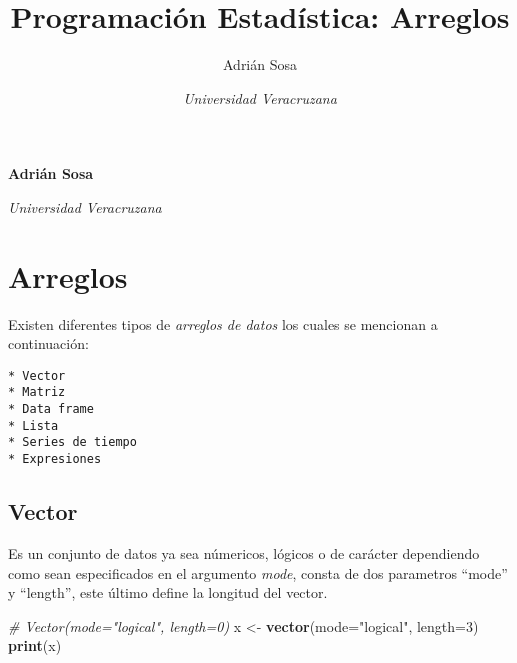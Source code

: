 \documentclass[11pt,]{article}
\title{Programación Estadística: Arreglos  }
\author{\Large Adrián Sosa\vspace{0.05in} \newline\normalsize\emph{}   \and \Large \vspace{0.05in} \newline\normalsize\emph{Universidad Veracruzana}  }
\date{}
\newcommand*{\authorfont}{\fontfamily{phv}\selectfont}
\newenvironment{Shaded}{\begin{snugshade}}{\end{snugshade}}
\newcommand{\CommentTok}[1]{\textcolor[rgb]{0.56,0.35,0.01}{\textit{#1}}}
\newcommand{\DataTypeTok}[1]{\textcolor[rgb]{0.13,0.29,0.53}{#1}}
\newcommand{\DecValTok}[1]{\textcolor[rgb]{0.00,0.00,0.81}{#1}}
\newcommand{\KeywordTok}[1]{\textcolor[rgb]{0.13,0.29,0.53}{\textbf{#1}}}
\newcommand{\NormalTok}[1]{#1}
\newcommand{\StringTok}[1]{\textcolor[rgb]{0.31,0.60,0.02}{#1}}
\begin{document}
	
%

{%
\setlength{\parindent}{0pt}
\thispagestyle{plain}
{\fontsize{18}{20}\selectfont\raggedright 
\maketitle  %

}

{
   \vskip 13.5pt\relax \normalsize\fontsize{11}{12} 
\textbf{\authorfont Adrián Sosa} \hskip 15pt \emph{\small }   \par \textbf{\authorfont } \hskip 15pt \emph{\small Universidad Veracruzana}   

}

}






\vskip -8.5pt



\noindent  

\hypertarget{arreglos}{%
\section{Arreglos}\label{arreglos}}

Existen diferentes tipos de \emph{arreglos de datos} los cuales se
mencionan a continuación:

\begin{verbatim}
* Vector
* Matriz
* Data frame
* Lista
* Series de tiempo
* Expresiones
\end{verbatim}

\hypertarget{vector}{%
\subsection{Vector}\label{vector}}

Es un conjunto de datos ya sea númericos, lógicos o de carácter
dependiendo como sean especificados en el argumento \emph{mode}, consta
de dos parametros ``mode'' y ``length'', este último define la longitud
del vector.

\begin{Shaded}
\begin{Highlighting}[]
\CommentTok{# Vector(mode="logical", length=0)}
\NormalTok{x <-}\StringTok{ }\KeywordTok{vector}\NormalTok{(}\DataTypeTok{mode=}\StringTok{"logical"}\NormalTok{, }\DataTypeTok{length=}\DecValTok{3}\NormalTok{)}
\KeywordTok{print}\NormalTok{(x)}
\end{Highlighting}
\end{Shaded}
\end{document}

